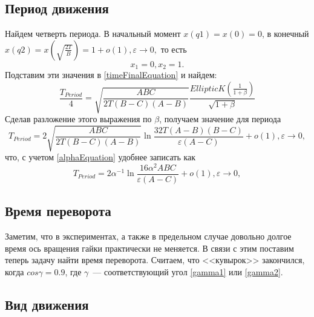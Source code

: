 \documentclass{article}
\begin{document}
\subsection{Период движения}
Найдем четверть периода. В начальный момент \begin{math} x(q1)=x(0)=0 \end{math}, в конечный \begin{math} x(q2)=x(\sqrt{\frac{2T}{B}})=1+o(1),\varepsilon\rightarrow 0, \end{math} то есть
\begin{equation}
x_1=0, x_2=1.
\end{equation}
Подставим эти значения в \ref{timeFinalEquation} и найдем:
\begin{equation}
\frac{T_{Period}}{4}=\sqrt{\frac{ABC}{2T(B-C)(A-B)}}\frac{EllipticK(\frac{1}{1 + \beta})}{\sqrt{1 + \beta}}
\end{equation}
Сделав разложение этого выражения по \begin{math} \beta \end{math}, получаем значение для периода
\begin{equation}
T_{Period}=2\sqrt{\frac{ABC}{2T(B-C)(A-B)}}\ln{\frac{32T(A-B)(B-C)}{\varepsilon(A-C)}}+o(1),\varepsilon\rightarrow 0,
\end{equation}
что, с учетом \ref{alphaEquation} удобнее записать как
\begin{equation}
T_{Period}=2\alpha^{-1}\ln{\frac{16\alpha^2ABC}{\varepsilon(A-C)}}+o(1),\varepsilon\rightarrow 0,
\end{equation}

\subsection{Время переворота}
Заметим, что в экспериментах, а также в предельном случае довольно долгое время ось вращения гайки практически не меняется. В связи с этим поставим теперь задачу найти время переворота. Считаем, что <<кувырок>> закончился, когда \begin{math} cos\gamma=0.9 \end{math}, где \begin{math} \gamma \end{math}~--- соответствующий угол \ref{gamma1} или \ref{gamma2}.

\subsection{Вид движения}
\end{document}
